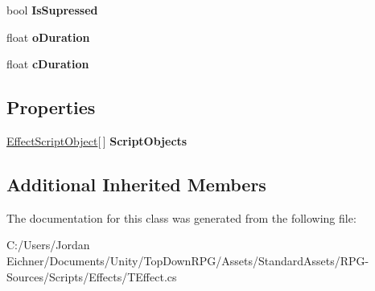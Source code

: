\begin{DoxyCompactItemize}
\item 
\hypertarget{class_t_effect_a7f399810b14063d6c6b0b610371716cf}{}bool {\bfseries Is\+Supressed}\label{class_t_effect_a7f399810b14063d6c6b0b610371716cf}

\item 
\hypertarget{class_t_effect_a3f8f5bc0e5f84245b3796f323d58972e}{}float {\bfseries o\+Duration}\label{class_t_effect_a3f8f5bc0e5f84245b3796f323d58972e}

\item 
\hypertarget{class_t_effect_a8c14995057021d94bf01d4821ff6534f}{}float {\bfseries c\+Duration}\label{class_t_effect_a8c14995057021d94bf01d4821ff6534f}

\end{DoxyCompactItemize}
\subsection*{Properties}
\begin{DoxyCompactItemize}
\item 
\hypertarget{class_t_effect_a5809fc4642f65d39a96e84eca3d16181}{}\hyperlink{class_effect_script_object}{Effect\+Script\+Object}\mbox{[}$\,$\mbox{]} {\bfseries Script\+Objects}\label{class_t_effect_a5809fc4642f65d39a96e84eca3d16181}

\end{DoxyCompactItemize}
\subsection*{Additional Inherited Members}


The documentation for this class was generated from the following file\+:\begin{DoxyCompactItemize}
\item 
C\+:/\+Users/\+Jordan Eichner/\+Documents/\+Unity/\+Top\+Down\+R\+P\+G/\+Assets/\+Standard\+Assets/\+R\+P\+G-\/\+Sources/\+Scripts/\+Effects/T\+Effect.\+cs\end{DoxyCompactItemize}
